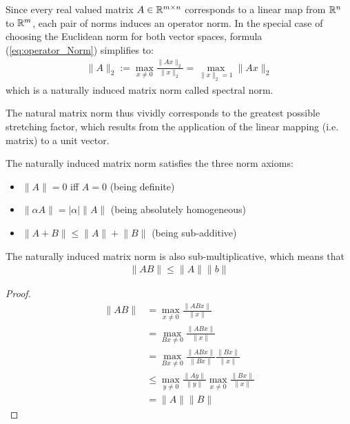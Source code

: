 \begin{remark}
	Since every real valued matrix $A \in \mathbb{R}^{m \times n}$ corresponds to a linear map from $\mathbb{R}^n$ to $\mathbb{R}^m$, each pair of norms induces an operator norm. In the special case of choosing the Euclidean norm for both vector spaces, formula (\ref{eq:operator_Norm}) simplifies to:
	\begin{align}\label{eq:matrix_Norm}
		\lVert A \rVert_2 := \max_{x \neq 0} \frac{\lVert Ax \rVert_2}{\lVert x \rVert_2} = \max_{\lVert x \rVert_{2} = 1} \lVert Ax \rVert_2
	\end{align}	
	which is a naturally induced matrix norm called spectral norm. 
\end{remark}

The natural matrix norm thus vividly corresponds to the greatest possible stretching factor, which results from the application of the linear mapping (i.e. matrix) to a unit vector.

\begin{remark}
	The naturally induced matrix norm satisfies the three norm axioms:
	\begin{itemize}
		\item $\lVert A \rVert = 0$ iff $A = 0$ \hfill (being definite)
		\item $\lVert \alpha A \rVert = |\alpha| \lVert A \rVert$ \hfill (being absolutely homogeneous)
		\item $\lVert A + B  \rVert \leq \lVert A \rVert + \lVert B \rVert$ \hfill (being sub-additive)
	\end{itemize}
\end{remark}

\begin{remark}
	The naturally induced matrix norm is also sub-multiplicative, which means that
	\begin{align*}
		\lVert AB \rVert \leq \lVert A \rVert \lVert b \rVert
	\end{align*}
	\begin{proof}
		\begin{align*}
		\lVert AB \lVert 	&= \max_{x \ne 0} \frac{\lVert ABx \lVert}{\lVert x \lVert} \\
							&=\max_{Bx \ne 0}\frac{\lVert ABx \lVert }{\lVert x\lVert } \\
							&=\max_{ Bx\ne 0}\frac{\lVert ABx\lVert}{\lVert Bx \lVert} \frac{\lVert Bx \lVert}{\lVert x \lVert} \\
							&\le \max_{y \ne 0} \frac{\lVert Ay \lVert}{\lVert y \lVert} \max_{x \ne 0} \frac{\lVert Bx \lVert}{\lVert x \lVert} \\
							&= \lVert A \lVert \lVert B \lVert
		\end{align*}
	\end{proof}
\end{remark}

